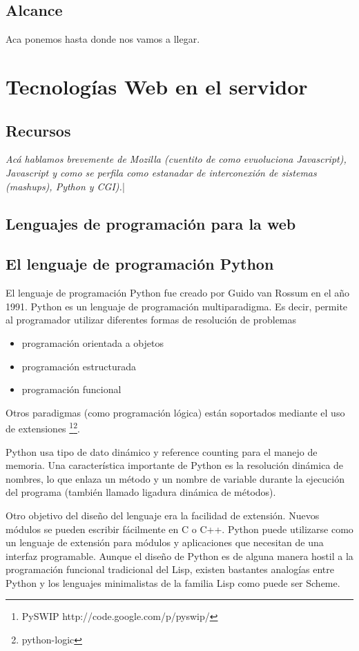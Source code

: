 \documentclass[a4paper]{report}
\begin{document}
\section{Alcance}

Aca ponemos hasta donde nos vamos a llegar.

\chapter{Tecnologías Web en el servidor}

\section{Recursos}
\emph{Acá hablamos brevemente de Mozilla (cuentito de como evuoluciona Javascript), Javascript y como se 
perfila como estanadar de interconexión de sistemas (mashups), Python y CGI).}|
 
\section{Lenguajes de programación para la web}
\section{El lenguaje de programación Python}
\label{lang:python}
El lenguaje de programación Python fue creado por Guido van Rossum en el año 1991.
Python es un lenguaje de programación multiparadigma. Es decir, permite al 
programador utilizar diferentes formas de resolución de problemas
\begin{itemize}
 \item {programación orientada a objetos}
 \item {programación estructurada}
 \item {programación funcional}
\end{itemize}
Otros paradigmas (como programación lógica) están soportados mediante el uso de extensiones
\footnote{PySWIP http://code.google.com/p/pyswip/}\footnote{python-logic}.

Python usa tipo de dato dinámico y reference counting para el manejo de memoria. 
Una característica importante de Python es la resolución dinámica de nombres, 
lo que enlaza un método y un nombre de variable durante la ejecución del programa 
(también llamado ligadura dinámica de métodos).

Otro objetivo del diseño del lenguaje era la facilidad de extensión. 
Nuevos módulos se pueden escribir fácilmente en C o C++. 
Python puede utilizarse como un lenguaje de extensión para módulos y 
aplicaciones que necesitan de una interfaz programable. Aunque el diseño de Python es 
de alguna manera hostil a la programación funcional tradicional del Lisp, existen bastantes analogías 
entre Python y los lenguajes minimalistas de la familia Lisp como puede ser Scheme.
\end{document}

